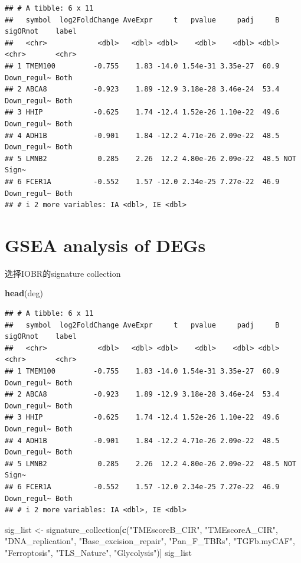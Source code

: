 \documentclass[
  12pt,
]{book}
\newenvironment{Shaded}{\begin{snugshade}}{\end{snugshade}}
\newcommand{\FunctionTok}[1]{\textcolor[rgb]{0.13,0.29,0.53}{\textbf{#1}}}
\newcommand{\NormalTok}[1]{#1}
\newcommand{\OtherTok}[1]{\textcolor[rgb]{0.56,0.35,0.01}{#1}}
\newcommand{\StringTok}[1]{\textcolor[rgb]{0.31,0.60,0.02}{#1}}
\theoremstyle{definition}
\theoremstyle{definition}
\theoremstyle{definition}
\theoremstyle{definition}
\theoremstyle{remark}
\begin{document}
\begin{verbatim}
## # A tibble: 6 x 11
##   symbol  log2FoldChange AveExpr     t   pvalue     padj     B sigORnot    label
##   <chr>            <dbl>   <dbl> <dbl>    <dbl>    <dbl> <dbl> <chr>       <chr>
## 1 TMEM100         -0.755    1.83 -14.0 1.54e-31 3.35e-27  60.9 Down_regul~ Both 
## 2 ABCA8           -0.923    1.89 -12.9 3.18e-28 3.46e-24  53.4 Down_regul~ Both 
## 3 HHIP            -0.625    1.74 -12.4 1.52e-26 1.10e-22  49.6 Down_regul~ Both 
## 4 ADH1B           -0.901    1.84 -12.2 4.71e-26 2.09e-22  48.5 Down_regul~ Both 
## 5 LMNB2            0.285    2.26  12.2 4.80e-26 2.09e-22  48.5 NOT         Sign~
## 6 FCER1A          -0.552    1.57 -12.0 2.34e-25 7.27e-22  46.9 Down_regul~ Both 
## # i 2 more variables: IA <dbl>, IE <dbl>
\end{verbatim}

\hypertarget{gsea-analysis-of-degs}{%
\section{GSEA analysis of DEGs}\label{gsea-analysis-of-degs}}

选择IOBR的signature collection

\begin{Shaded}
\begin{Highlighting}[]
\FunctionTok{head}\NormalTok{(deg)}
\end{Highlighting}
\end{Shaded}

\begin{verbatim}
## # A tibble: 6 x 11
##   symbol  log2FoldChange AveExpr     t   pvalue     padj     B sigORnot    label
##   <chr>            <dbl>   <dbl> <dbl>    <dbl>    <dbl> <dbl> <chr>       <chr>
## 1 TMEM100         -0.755    1.83 -14.0 1.54e-31 3.35e-27  60.9 Down_regul~ Both 
## 2 ABCA8           -0.923    1.89 -12.9 3.18e-28 3.46e-24  53.4 Down_regul~ Both 
## 3 HHIP            -0.625    1.74 -12.4 1.52e-26 1.10e-22  49.6 Down_regul~ Both 
## 4 ADH1B           -0.901    1.84 -12.2 4.71e-26 2.09e-22  48.5 Down_regul~ Both 
## 5 LMNB2            0.285    2.26  12.2 4.80e-26 2.09e-22  48.5 NOT         Sign~
## 6 FCER1A          -0.552    1.57 -12.0 2.34e-25 7.27e-22  46.9 Down_regul~ Both 
## # i 2 more variables: IA <dbl>, IE <dbl>
\end{verbatim}

\begin{Shaded}
\begin{Highlighting}[]
\NormalTok{sig\_list }\OtherTok{\textless{}{-}}\NormalTok{ signature\_collection[}\FunctionTok{c}\NormalTok{(}\StringTok{"TMEscoreB\_CIR"}\NormalTok{, }\StringTok{"TMEscoreA\_CIR"}\NormalTok{, }\StringTok{"DNA\_replication"}\NormalTok{, }\StringTok{"Base\_excision\_repair"}\NormalTok{,}
                                   \StringTok{"Pan\_F\_TBRs"}\NormalTok{, }\StringTok{"TGFb.myCAF"}\NormalTok{, }\StringTok{"Ferroptosis"}\NormalTok{, }\StringTok{"TLS\_Nature"}\NormalTok{, }\StringTok{"Glycolysis"}\NormalTok{)]}
\NormalTok{sig\_list}
\end{Highlighting}
\end{Shaded}
\end{document}
